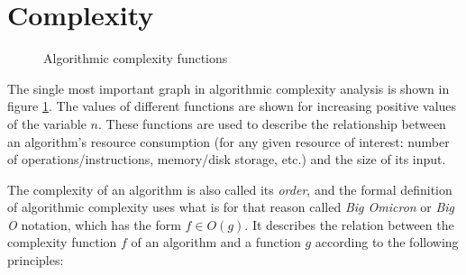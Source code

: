 \section{Complexity}

\begin{figure}[p]
    \centering
    
    \caption{Algorithmic complexity functions}
    \label{fig:algo:comp}
\end{figure}

The single most important graph in algorithmic complexity analysis is shown in
figure \ref{fig:algo:comp}.  The values of different functions are shown for
increasing positive values of the variable $n$.  These functions are used to
describe the relationship between an algorithm's resource consumption (for any
given resource of interest: number of operations/instructions, memory/disk
storage, etc.) and the size of its input.

The complexity of an algorithm is also called its \textit{order}, and the formal
definition of algorithmic complexity uses what is for that reason called
\textit{Big Omicron} or \textit{Big O} notation\footnotemark, which has the form
$f \in O(g)$.  It describes the relation between the complexity function $f$ of
an algorithm and a function $g$ according to the following principles:



